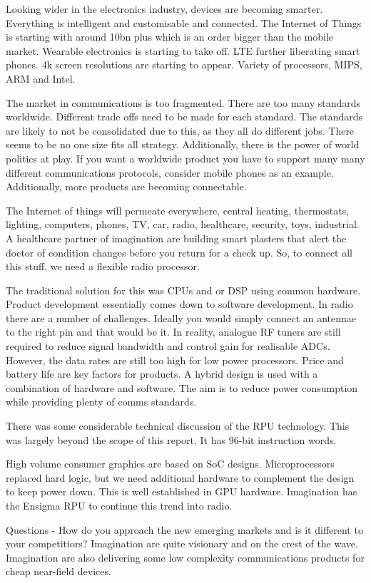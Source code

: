 Looking wider in the electronics industry, devices are becoming smarter. 
Everything is intelligent and customisable and connected. 
The Internet of Things is starting with around 10bn plus which is an order bigger than the mobile market. 
Wearable electronics is starting to take off. LTE further liberating smart phones. 
4k screen resolutions are starting to appear. 
Variety of processors, MIPS, ARM and Intel.

The market in communications is too fragmented. 
There are too many standards worldwide. 
Different trade offs need to be made for each standard. 
The standards are likely to not be consolidated due to this, as they all do different jobs. 
There seems to be no one size fits all strategy. Additionally, there is the power of world politics at play. 
If you want a worldwide product you have to support many many different communications protocols, consider mobile phones as an example. 
Additionally, more products are becoming connectable. 

The Internet of things will permeate everywhere, central heating, thermostats, lighting, computers, phones, TV, car, radio, healthcare, security, toys, industrial. 
A healthcare partner of imagination are building smart plasters that alert the doctor of condition changes before you return for a check up. 
So, to connect all this stuff, we need a flexible radio processor.

The traditional solution for this was CPUs and or DSP using common hardware.
 Product development essentially comes down to software development.
 In radio there are a number of challenges. Ideally you would simply connect an antennae to the right pin and that would be it. 
In reality, analogue RF tuners are still required to reduce signal bandwidth and control gain for realisable ADCs. 
However, the data rates are still too high for low power processors. Price and battery life are key factors for products. 
A hybrid design is used with a combination of hardware and software. 
The aim is to reduce power consumption while providing plenty of comms standards.

There was some considerable technical discussion of the RPU technology. 
This was largely beyond the scope of this report. 
It has 96-bit instruction words.

High volume consumer graphics are based on SoC designs. 
Microprocessors replaced hard logic, but we need additional hardware to complement the design to keep power down.
 This is well established in GPU hardware. 
Imagination has the Ensigma RPU to continue this trend into radio.

Questions - How do you approach the new emerging markets and is it different to your competitiors? 
Imagination are quite visionary and on the crest of the wave. 
Imagination are also delivering some low complexity communications products for cheap near-field devices. 

